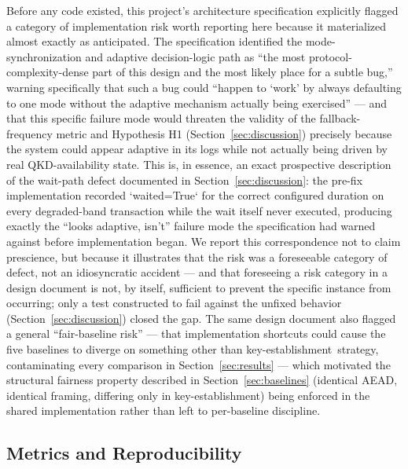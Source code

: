 \documentclass[journal]{IEEEtran}
\newcommand{\keyest}{key-establishment}
\begin{document}
Before any code existed, this project's architecture specification explicitly flagged a category of implementation risk worth reporting here because it materialized almost exactly as anticipated. The specification identified the mode-synchronization and adaptive decision-logic path as ``the most protocol-complexity-dense part of this design and the most likely place for a subtle bug,'' warning specifically that such a bug could ``happen to `work' by always defaulting to one mode without the adaptive mechanism actually being exercised'' --- and that this specific failure mode would threaten the validity of the fallback-frequency metric and Hypothesis H1 (Section~\ref{sec:discussion}) precisely because the system could appear adaptive in its logs while not actually being driven by real QKD-availability state. This is, in essence, an exact prospective description of the wait-path defect documented in Section~\ref{sec:discussion}: the pre-fix implementation recorded `waited=True` for the correct configured duration on every degraded-band transaction while the wait itself never executed, producing exactly the ``looks adaptive, isn't'' failure mode the specification had warned against before implementation began. We report this correspondence not to claim prescience, but because it illustrates that the risk was a foreseeable category of defect, not an idiosyncratic accident --- and that foreseeing a risk category in a design document is not, by itself, sufficient to prevent the specific instance from occurring; only a test constructed to fail against the unfixed behavior (Section~\ref{sec:discussion}) closed the gap. The same design document also flagged a general ``fair-baseline risk'' --- that implementation shortcuts could cause the five baselines to diverge on something other than \keyest\ strategy, contaminating every comparison in Section~\ref{sec:results} --- which motivated the structural fairness property described in Section~\ref{sec:baselines} (identical AEAD, identical framing, differing only in \keyest) being enforced in the shared implementation rather than left to per-baseline discipline.

\subsection{Metrics and Reproducibility}
\end{document}
